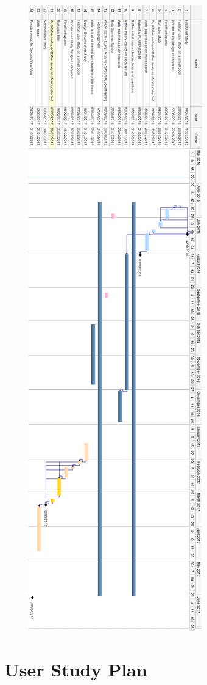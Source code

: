 \documentclass{mproj}
\begin{document}
\begin{figure}[h!]
    \includegraphics[height=0.9\vsize, width=1.1\hsize]{SecondYear.png}
\end{figure}
\section{User Study Plan}
\label{appendix:usertrial}

\end{document}

